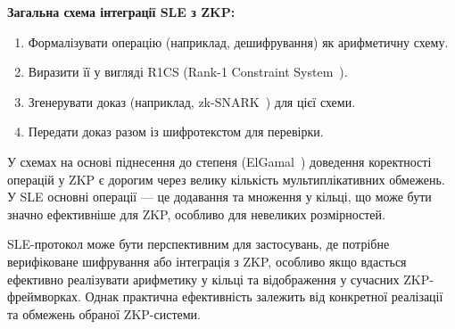 \textbf{Загальна схема інтеграції SLE з ZKP:}
\begin{enumerate}
    \item Формалізувати операцію (наприклад, дешифрування) як арифметичну схему.
    \item Виразити її у вигляді R1CS (Rank-1 Constraint System~\cite{ParnoEtAl13Pinocchio}).
    \item Згенерувати доказ (наприклад, zk-SNARK~\cite{Groth16, BenSassonEtAl13}) для цієї схеми.
    \item Передати доказ разом із шифротекстом для перевірки.
\end{enumerate}

У схемах на основі піднесення до степеня (ElGamal~\cite{ElGamal85, BonehShoup20}) доведення коректності операцій у ZKP є дорогим через велику кількість мультиплікативних обмежень.
У SLE основні операції — це додавання та множення у кільці, що може бути значно ефективніше для ZKP, особливо для невеликих розмірностей.

SLE-протокол може бути перспективним для застосувань, де потрібне верифіковане шифрування або інтеграція з ZKP, особливо якщо вдасться ефективно реалізувати арифметику у кільці та відображення у сучасних ZKP-фреймворках.
Однак практична ефективність залежить від конкретної реалізації та обмежень обраної ZKP-системи.
